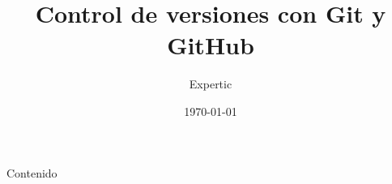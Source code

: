 \documentclass{beamer}
\title[Git y GitHub] 
{Control de versiones con Git y GitHub }
\author[Expertic] 
{Expertic} %
\institute[]{
\inst{}Escuela de Física, Universidad Industrial de Santander, Bucaramanga, Colombia.}
\date{\today}
\begin{document}


\begin{frame}
\titlepage %
\end{frame}

\begin{frame}{Contenido}
  \tableofcontents
\end{frame}
\end{document}
